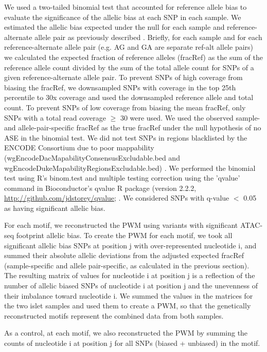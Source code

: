 We used a two-tailed binomial test that accounted for reference allele bias to evaluate the significance of the allelic bias at each SNP in each sample.  We estimated the allelic bias expected under the null for each sample and reference-alternate allele pair as previously described \cite{lappalainenTranscriptomeGenomeSequencing2013}. Briefly, for each sample and for each reference-alternate allele pair (e.g. AG and GA are separate ref-alt allele pairs) we calculated the expected fraction of reference alleles (fracRef) as the sum of the reference allele count divided by the sum of the total allele count for SNPs of a given reference-alternate allele pair. To prevent SNPs of high coverage from biasing the fracRef, we downsampled SNPs with coverage in the top 25th percentile to 30x coverage and used the downsampled reference allele and total count. To prevent SNPs of low coverage from biasing the mean fracRef, only SNPs with a total read coverage $\geq$ 30 were used. We used the observed sample- and allele-pair-specific fracRef as the true fracRef under the null hypothesis of no ASE in the binomial test. We did not test SNPs in regions blacklisted by the ENCODE Consortium due to poor mappability (wgEncodeDacMapabilityConsensusExcludable.bed and wgEncodeDukeMapabilityRegionsExcludable.bed) \cite{battleCharacterizingGeneticBasis2013}. We performed the binomial test using R’s binom.test and multiple testing correction using the 'qvalue' command in Bioconductor’s qvalue R package (version 2.2.2, \url{http://github.com/jdstorey/qvalue}; \cite{storeyStatisticalSignificanceGenomewide2003}. We considered SNPs with q-value $<$ 0.05 as having significant allelic bias.

For each motif, we reconstructed the PWM using variants with significant ATAC-seq footprint allelic bias. To create the PWM for each motif, we took all significant allelic bias SNPs at position j with over-represented nucleotide i, and summed their absolute allelic deviations from the adjusted expected fracRef (sample-specific and allele pair-specific, as calculated in the previous section). The resulting matrix of values for nucleotide i at position j is a reflection of the number of allelic biased SNPs of nucleotide i at position j and the unevenness of their imbalance toward nucleotide i. We summed the values in the matrices for the two islet samples and used them to create a PWM, so that the genetically reconstructed motifs represent the combined data from both samples. 

As a control, at each motif, we also reconstructed the PWM by summing the counts of nucleotide i at position j for all SNPs (biased + unbiased) in the motif.

